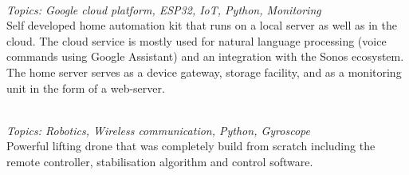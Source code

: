  \\
\emph{Topics: Google cloud platform, ESP32, IoT, Python, Monitoring} \\
Self developed home automation kit that runs on a local server as well as in the cloud. The cloud service is mostly used for natural language processing (voice commands using Google Assistant) and an integration with the Sonos ecosystem. The home server serves as a device gateway, storage facility, and as a monitoring unit in the form of a web-server. 
\SmallSep

 \\
\emph{Topics: Robotics, Wireless communication, Python, Gyroscope} \\
Powerful lifting drone that was completely build from scratch including the remote controller, stabilisation algorithm and control software.
\Sep
